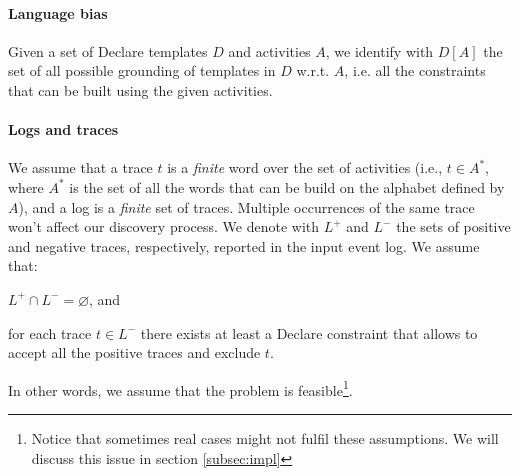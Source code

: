 \paragraph{Language bias} Given a set of Declare templates $D$ and activities $A$, we identify with $D[A]$ the set of all possible grounding of templates in $D$ w.r.t. $A$, i.e. all the constraints that can be built using the given activities.

\paragraph{Logs and traces} We assume that a trace $t$ is a \emph{finite} word over the set of activities (i.e., $t\in A^*$, where $A^*$ is the set of all the words that can be build on the alphabet defined by $A$), and a log is a \emph{finite} set of traces. Multiple occurrences of the same trace won't affect our discovery process. We denote with $L^+$ and $L^-$ the sets of positive and negative traces, respectively, reported in the input event log. We assume that:
\begin{enumerate*}[label=(\textit{\roman*})]
\item $L^+ \cap L^- = \varnothing$, and 
\item for each trace $t \in L^-$ there exists at least a Declare constraint that allows to accept all the positive traces and exclude $t$.
\end{enumerate*}
In other words, we assume that the problem is feasible\footnote{Notice that sometimes real cases might not fulfil these assumptions. We will discuss this issue in section \ref{subsec:impl}}.

